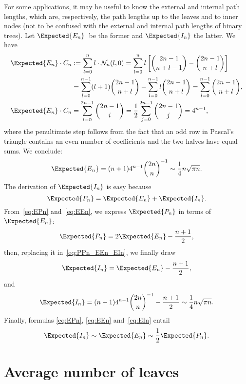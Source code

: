 For some applications, it may be useful to know the external and
internal path lengths, which are, respectively, the path lengths up to
the leaves and to inner nodes (not to be confused with the external
and internal path lengths of binary trees). Let \(\Expected{E_n}\)~be
the former and \(\Expected{I_n}\) the latter. We have
\begin{align*}
\Expected{E_n} \cdot C_n
  &:= \sum_{l=0}^{n} l \cdot \mathcal{N}_n(l,0)
   = \sum_{l=0}^{n}l\left[\binom{2n-1}{n+l-1} -
     \binom{2n-1}{n+l}\right]\\
  &= \sum_{l=0}^{n-1}(l+1)\binom{2n-1}{n+l} -
     \sum_{l=0}^{n-1}l \binom{2n-1}{n+l}
   = \sum_{l=0}^{n-1}\binom{2n-1}{n+l},\\
\Expected{E_n} \cdot C_n
  &= \sum_{i=n}^{2n-1}\binom{2n-1}{i}
   = \frac{1}{2}\sum_{j=0}^{2n-1}\binom{2n-1}{j} = 4^{n-1},
\end{align*}
where the penultimate step follows from the fact that an odd row in
Pascal's triangle contains an even number of coefficients and the two
halves have equal sums. We conclude:
\begin{equation}
\Expected{E_n} = (n+1) 4^{n-1}\binom{2n}{n}^{-1} \sim
\frac{1}{4}n\sqrt{\pi n}.
\label{eq:EEn}
\end{equation}
The derivation of \(\Expected{I_n}\) is easy because
\begin{equation}
\Expected{P_n} = \Expected{E_n} + \Expected{I_n}.
\label{eq:PPn_EEn_EIn}
\end{equation}
From~\eqref{eq:EPn} and~\eqref{eq:EEn}, we express \(\Expected{P_n}\)
in terms of \(\Expected{E_n}\):
\begin{equation*}
\Expected{P_n} = 2 \Expected{E_n} - \frac{n+1}{2},
\end{equation*}
then, replacing it in~\eqref{eq:PPn_EEn_EIn}, we finally draw
\begin{equation*}
\Expected{I_n} = \Expected{E_n} - \frac{n+1}{2},
\end{equation*}
and
\begin{equation}
\Expected{I_n}
  = (n+1)4^{n-1}\binom{2n}{n}^{-1} - \frac{n+1}{2} \sim
  \frac{1}{4}n\sqrt{\pi n}.
\label{eq:EIn}
\end{equation}
Finally, formulas \eqref{eq:EPn}, \eqref{eq:EEn} and~\eqref{eq:EIn}
entail
\begin{equation*}
\Expected{I_n} \sim \Expected{E_n} \sim \frac{1}{2}\Expected{P_n}.
\end{equation*}

\section{Average number of leaves}

